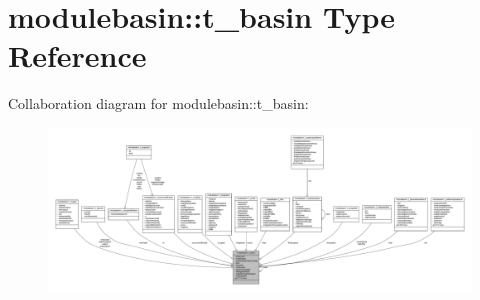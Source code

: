\hypertarget{structmodulebasin_1_1t__basin}{}\section{modulebasin\+:\+:t\+\_\+basin Type Reference}
\label{structmodulebasin_1_1t__basin}


Collaboration diagram for modulebasin\+:\+:t\+\_\+basin\+:\nopagebreak
\begin{figure}[H]
\begin{center}
\leavevmode
\includegraphics[width=350pt]{structmodulebasin_1_1t__basin__coll__graph}
\end{center}
\end{figure}
